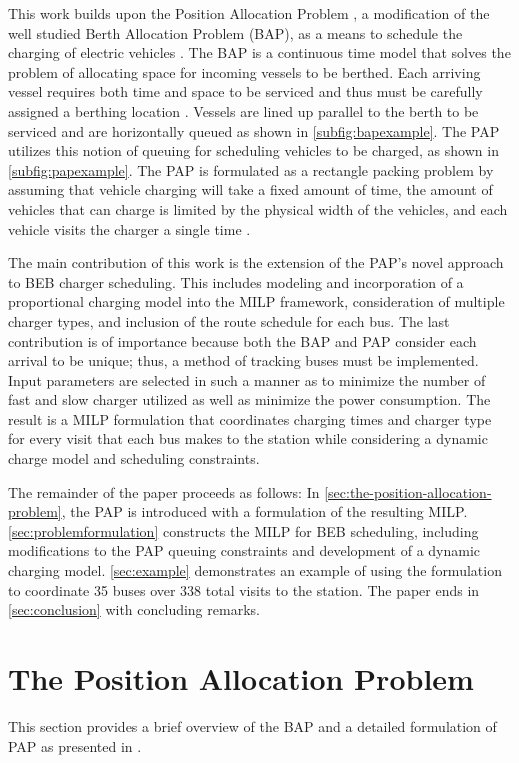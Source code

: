 \documentclass[utf8]{FrontiersinHarvard}
\let\cite\citep                                       %
\newcommand{\A}{35 }                                                            %
\newcommand{\N}{338 }                                                           %
\begin{document}
This work builds upon the Position Allocation Problem \cite{qarebagh-2019-optim-sched}, a modification of the well
studied Berth Allocation Problem (BAP), as a means to schedule the charging of electric vehicles
\cite{buhrkal-2011-model-discr,frojan-2015-contin-berth,imai-2001-dynam-berth}. The BAP is a continuous time model that
solves the problem of allocating space for incoming vessels to be berthed. Each arriving vessel requires both time and
space to be serviced and thus must be carefully assigned a berthing location \cite{imai-2001-dynam-berth}. Vessels are
lined up parallel to the berth to be serviced and are horizontally queued as shown in \autoref{subfig:bapexample}. The
PAP utilizes this notion of queuing for scheduling vehicles to be charged, as shown in \autoref{subfig:papexample}. The
PAP is formulated as a rectangle packing problem by assuming that vehicle charging will take a fixed amount of time, the
amount of vehicles that can charge is limited by the physical width of the vehicles, and each vehicle visits the charger
a single time \cite{qarebagh-2019-optim-sched}.

The main contribution of this work is the extension of the PAP's novel approach to BEB charger scheduling. This includes
modeling and incorporation of a proportional charging model into the MILP framework, consideration of multiple charger
types, and inclusion of the route schedule for each bus. The last contribution is of importance because both the BAP and
PAP consider each arrival to be unique; thus, a method of tracking buses must be implemented. Input parameters are
selected in such a manner as to minimize the number of fast and slow charger utilized as well as minimize the power
consumption. The result is a MILP formulation that coordinates charging times and charger type for every visit that each
bus makes to the station while considering a dynamic charge model and scheduling constraints.

The remainder of the paper proceeds as follows: In \autoref{sec:the-position-allocation-problem}, the PAP is introduced with a
formulation of the resulting MILP. \autoref{sec:problemformulation} constructs the MILP for BEB scheduling, including
modifications to the PAP queuing constraints and development of a dynamic charging model. \autoref{sec:example}
demonstrates an example of using the formulation to coordinate \A buses over \N total visits to the station. The paper
ends in \autoref{sec:conclusion} with concluding remarks.

\section{The Position Allocation Problem}
\label{sec:the-position-allocation-problem}
This section provides a brief overview of the BAP and a detailed formulation of PAP as presented in
\cite{qarebagh-2019-optim-sched}.
\end{document}
